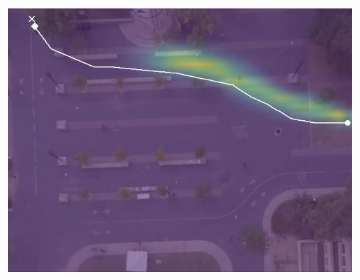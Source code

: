 \documentclass[usenames,dvipsnames]{article}
\begin{document}
\begin{enumerate}
\begin{item}
\begin{figure}[t!]
\begin{subfigure}[t]{0.5\textwidth}
\begin{minipage}[c]{0.3\linewidth}
		\includegraphics[width=\linewidth]{./figures/bookstore/kit_1_2_t=370.jpg}
	\end{minipage}
	

\end{subfigure}
\end{figure}
\end{item}
\end{enumerate}
\end{document}
